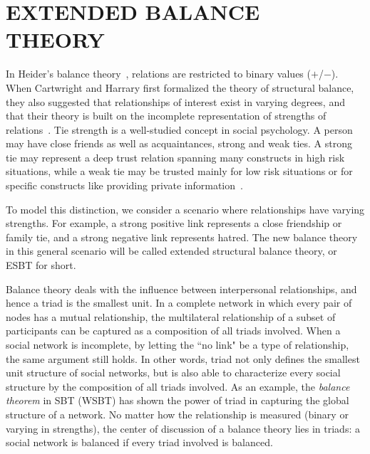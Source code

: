  

\chapter{EXTENDED BALANCE THEORY} \label{sec:esbt}
In Heider's balance theory~\cite{Heider:46}, relations are restricted to binary values
($+$/$-$). When Cartwright
and Harrary first formalized the theory of structural balance, they
also suggested that relationships of interest exist in varying
degrees, and that their theory is built on the incomplete
representation of strengths of relations~\cite{Cartwright:56}. Tie
strength is a well-studied concept in social psychology. A person may
have close friends as well as acquaintances, strong and weak ties. A strong tie may represent a deep
trust relation spanning many constructs in high risk situations, while
a weak tie may be trusted mainly for low risk situations or for
specific constructs like providing private
information~\cite{Granovetter:1973}.

To model this distinction, we consider a scenario where relationships
have varying strengths. For example, a strong positive link represents a close
friendship or family tie, and a strong negative link represents hatred. The new balance theory in this general scenario will be called extended structural balance theory, or ESBT for short.  

Balance theory deals with the influence between interpersonal relationships, and hence a triad is the smallest unit. In a complete network in which every pair of nodes has a mutual relationship, the multilateral relationship of a subset of participants can be captured as a composition of all triads involved. When a social network is incomplete, by letting the ``no link" be a type of relationship, the same argument still holds. In other words, triad not only defines the smallest unit structure of social networks, but is also able to characterize every social structure by the composition of all triads involved. As an example, the {\it balance theorem} in SBT (WSBT) has shown the power of triad in capturing the global structure of a network. No matter how the relationship is measured (binary or varying in strengths), the center of discussion of a balance theory lies in triads: a social network is balanced if every triad involved is balanced.  

